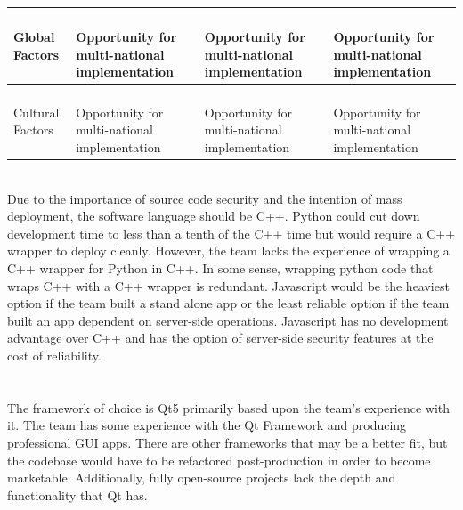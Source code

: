 \documentclass[12pt]{article}
\begin{document}
\begin{table}[h!]
\begin{tabular}{| l | l | l | l |}
\hline
\parbox{0.17\linewidth}{\raggedleft Global Factors} & 
\parbox{0.240\linewidth}{\hfill \\
Opportunity for multi-national implementation\\} & 
\parbox{0.240\linewidth}{\hfill \\
Opportunity for multi-national implementation\\} &  
\parbox{0.240\linewidth}{\hfill \\
Opportunity for multi-national implementation\\} \\
\hline
\parbox{0.17\linewidth}{\raggedleft Cultural Factors} & 
\parbox{0.240\linewidth}{\hfill \\
Opportunity for multi-national implementation\\} & 
\parbox{0.240\linewidth}{\hfill \\
Opportunity for multi-national implementation\\} & 
\parbox{0.240\linewidth}{\hfill \\
Opportunity for multi-national implementation\\} \\
\hline
\end{tabular}
\end{table}
\hfill \\

Due to the importance of source code security and the intention of mass deployment, the software language should be C++.  Python could cut down development time to less than a tenth of the C++ time but would require a C++ wrapper to deploy cleanly. However, the team lacks the experience of wrapping a C++ wrapper for Python in C++.  In some sense, wrapping python code that wraps C++ with a C++ wrapper is redundant.  Javascript would be the heaviest option if the team built a stand alone app or the least reliable option if the team built an app dependent on server-side operations.  Javascript has no development advantage over C++ and has the option of server-side security features at the cost of reliability.\\
\hfill \\
\pagebreak
\hfill \\
\indent
The framework of choice is Qt5 primarily based upon the team’s experience with it.  The team has some experience with the Qt Framework and producing professional GUI apps.  There are other frameworks that may be a better fit, but the codebase would have to be refactored post-production in order to become marketable.  Additionally, fully open-source projects lack the depth and functionality that Qt has.\\
\end{document}
